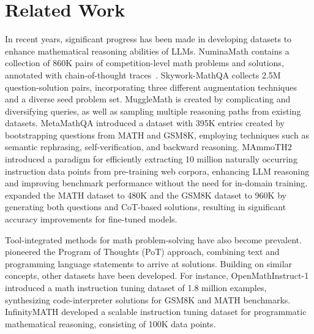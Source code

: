 \section{Related Work}



In recent years, significant progress has been made in developing datasets to enhance mathematical reasoning abilities of LLMs. 
NuminaMath \citep{li2024numinamath} contains a collection of 860K pairs of competition-level math problems and solutions, annotated with chain-of-thought traces~\citep{DBLP:conf/iclr/0002WSLCNCZ23}. 
Skywork-MathQA \citep{zeng2024skyworkmathdatascalinglaws} collects 2.5M question-solution pairs, incorporating three different augmentation techniques and a diverse seed problem set. MuggleMath \citep{li2024mugglemath} is created by complicating and diversifying queries, as well as sampling multiple reasoning paths from existing datasets.  MetaMathQA \citep{yu2024metamath} introduced a dataset with 395K entries created by bootstrapping questions from MATH and GSM8K, employing techniques such as semantic rephrasing, self-verification, and backward reasoning. MAmmoTH2 \citep{yue2024mammoth2} introduced a paradigm for efficiently extracting 10 million naturally occurring instruction data points from pre-training web corpora, enhancing LLM reasoning and improving benchmark performance without the need for in-domain training. \citet{li2024common} expanded the MATH dataset to 480K and the GSM8K dataset to 960K by generating both questions and CoT-based solutions, resulting in significant accuracy improvements for fine-tuned models.

Tool-integrated methods for math problem-solving have also become prevalent. \citet{DBLP:journals/tmlr/ChenM0C23} pioneered the Program of Thoughts (PoT) approach, combining text and programming language statements to arrive at solutions. 
Building on similar concepts, other datasets have been developed. For instance, OpenMathInstruct-1 \citep{toshniwal2024openmathinstruct} introduced a math instruction tuning dataset of 1.8 million examples, synthesizing code-interpreter solutions for GSM8K and MATH benchmarks. InfinityMATH  \citep{zhang2024infinitymath} developed a scalable instruction tuning dataset for programmatic mathematical reasoning, consisting of 100K data points.

